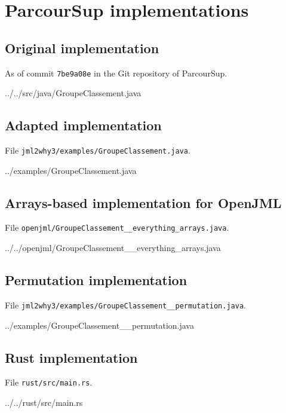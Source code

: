 \documentclass[a4paper]{report}
\begin{document}


\section{ParcourSup implementations}

\subsection{Original implementation}
\label{app:parcoursup-original}

As of commit \texttt{7be9a08e} in the Git repository of ParcourSup\cite{parcoursup-source}.

%
{../../src/java/GroupeClassement.java}

\clearpage
\subsection{Adapted implementation}
\label{app:parcoursup-adapted}

File \lstinline{jml2why3/examples/GroupeClassement.java}.

%
{../examples/GroupeClassement.java}

\clearpage
\subsection{Arrays-based implementation for OpenJML}
\label{app:parcoursup-arrays}

File \lstinline{openjml/GroupeClassement__everything_arrays.java}.

%
{../../openjml/GroupeClassement__everything_arrays.java}

\clearpage
\subsection{Permutation implementation}
\label{app:parcoursup-permutation}

File \lstinline{jml2why3/examples/GroupeClassement__permutation.java}.

%
{../examples/GroupeClassement__permutation.java}

\clearpage
\subsection{Rust implementation}
\label{app:parcoursup-rust}

File \lstinline{rust/src/main.rs}.

%
{../../rust/src/main.rs}
\end{document}
